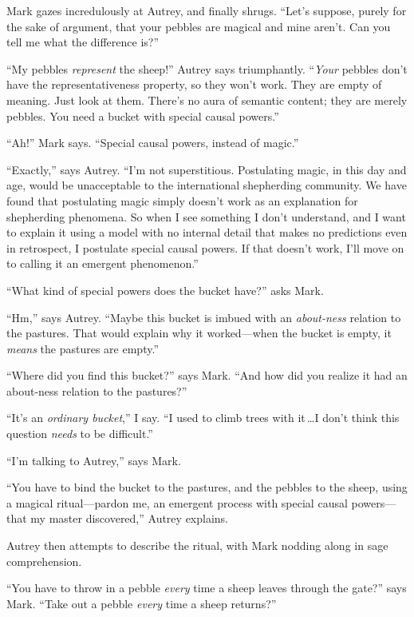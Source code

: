 {
 Mark gazes incredulously at Autrey, and finally shrugs.
``Let's suppose, purely for the sake
of argument, that your pebbles are magical and mine
aren't. Can you tell me what the difference
is?''}

{
 ``My pebbles \textit{represent} the
sheep!'' Autrey says triumphantly.
``\textit{Your} pebbles don't have the
representativeness property, so they won't work. They
are empty of meaning. Just look at them. There's no
aura of semantic content; they are merely pebbles. You need a bucket
with special causal powers.''}

{
 ``Ah!'' Mark says.
``Special causal powers, instead of
magic.''}

{
 ``Exactly,'' says Autrey.
``I'm not superstitious. Postulating
magic, in this day and age, would be unacceptable to the international
shepherding community. We have found that postulating magic simply
doesn't work as an explanation for shepherding
phenomena. So when I see something I don't understand,
and I want to explain it using a model with no internal detail that
makes no predictions even in retrospect, I postulate special causal
powers. If that doesn't work, I'll move
on to calling it an emergent phenomenon.''}

{
 ``What kind of special powers does the bucket
have?'' asks Mark.}

{
 ``Hm,'' says Autrey.
``Maybe this bucket is imbued with an
\textit{about-ness} relation to the pastures. That would explain why it
worked---when the bucket is empty, it \textit{means} the pastures are
empty.''}

{
 ``Where did you find this
bucket?'' says Mark. ``And how did
you realize it had an about-ness relation to the
pastures?''}

{
 ``It's an \textit{ordinary
bucket},'' I say. ``I used to climb
trees with it\,\ldots I don't think this question
\textit{needs} to be difficult.''}

{
 ``I'm talking to
Autrey,'' says Mark.}

{
 ``You have to bind the bucket to the pastures,
and the pebbles to the sheep, using a magical ritual---pardon me, an
emergent process with special causal powers---that my master
discovered,'' Autrey explains.}

{
 Autrey then attempts to describe the ritual, with Mark nodding
along in sage comprehension.}

{
 ``You have to throw in a pebble \textit{every}
time a sheep leaves through the gate?'' says Mark.
``Take out a pebble \textit{every} time a sheep
returns?''}


